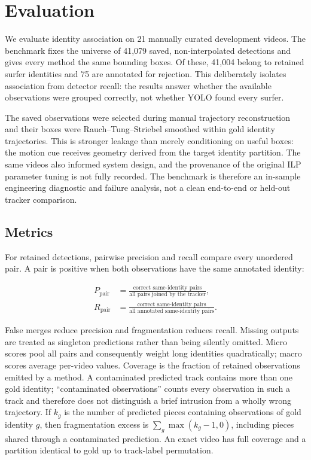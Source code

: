 \section{Evaluation}
\label{sec:evaluation}

We evaluate identity association on 21 manually curated development videos.  The
benchmark fixes the universe of 41,079 saved, non-interpolated detections and gives
every method the same bounding boxes.  Of these, 41,004 belong to retained surfer
identities and 75 are annotated for rejection.  This deliberately isolates
association from detector recall: the results answer whether the available
observations were grouped correctly, not whether YOLO found every surfer.

The saved observations were selected during manual trajectory reconstruction and
their boxes were Rauch--Tung--Striebel smoothed within gold identity trajectories.
This is stronger leakage than merely conditioning on useful boxes: the motion cue
receives geometry derived from the target identity partition.  The same videos also
informed system design, and the provenance of the original ILP parameter tuning is
not fully recorded.  The benchmark is therefore an in-sample engineering diagnostic
and failure analysis, not a clean end-to-end or held-out tracker comparison.

\subsection{Metrics}

For retained detections, pairwise precision and recall compare every unordered pair.
A pair is positive when both observations have the same annotated identity:

\begin{align}
  P_{\mathrm{pair}} &=
    \frac{\text{correct same-identity pairs}}
         {\text{all pairs joined by the tracker}}, \\
  R_{\mathrm{pair}} &=
    \frac{\text{correct same-identity pairs}}
         {\text{all annotated same-identity pairs}}.
\end{align}

False merges reduce precision and fragmentation reduces recall.  Missing outputs are
treated as singleton predictions rather than being silently omitted.  Micro scores
pool all pairs and consequently weight long identities quadratically; macro scores
average per-video values.  Coverage is the fraction of retained observations emitted
by a method.  A contaminated predicted track contains more than one gold identity;
``contaminated observations'' counts every observation in such a track and therefore
does not distinguish a brief intrusion from a wholly wrong trajectory.  If $k_g$ is
the number of predicted pieces containing observations of gold identity $g$, then
fragmentation excess is $\sum_g\max(k_g-1,0)$, including pieces shared through a
contaminated prediction.  An exact video has full coverage and a partition identical
to gold up to track-label permutation.


